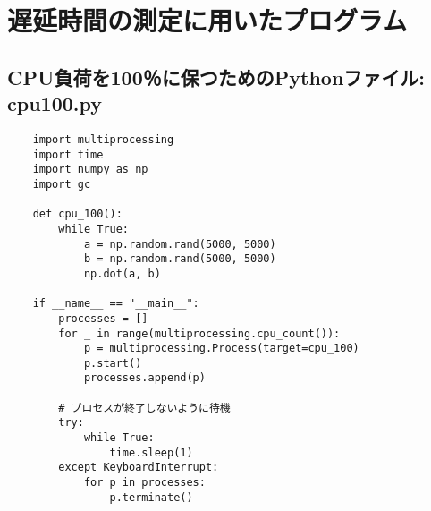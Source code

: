 \chapter{遅延時間の測定に用いたプログラム}
\section{CPU負荷を100％に保つためのPythonファイル: cpu100.py}
\begin{verbatim}
    import multiprocessing
    import time
    import numpy as np
    import gc

    def cpu_100():
        while True:
            a = np.random.rand(5000, 5000)
            b = np.random.rand(5000, 5000)
            np.dot(a, b)

    if __name__ == "__main__":
        processes = []
        for _ in range(multiprocessing.cpu_count()):
            p = multiprocessing.Process(target=cpu_100)
            p.start()
            processes.append(p)

        # プロセスが終了しないように待機
        try:
            while True:
                time.sleep(1)
        except KeyboardInterrupt:
            for p in processes:
                p.terminate()


\end{verbatim}

